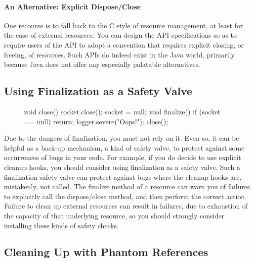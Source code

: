 \paragraph{An Alternative: Explicit Dispose/Close}
One recourse is to fall back to the C style of resource management, at least for
the case of external resources. You can design the API specifications so as to
require users of the API to adopt a convention that requires explicit closing,
or freeing, of resources. Such APIs do indeed exist in the Java world, primarily
because Java does not offer any especially palatable alternatives.

\subsection{Using Finalization as a Safety Valve}

\begin{figure}
\centering
\vspace{-4mm}
\begin{framedlisting}
void close() {
  socket.close();
  socket = null;
}
void finalize() {
  if (socket == null) return;
  logger.severe("Oops!");
  close();
}
\end{framedlisting}
\end{figure}

Due to the dangers of finalization, you must not rely on it. Even so, it can be
helpful as a back-up mechanism, a kind of safety valve, to protect against some
occurrences of bugs in your code. For example, if you do decide to use explicit
cleanup hooks, you should consider using finalization as a safety valve. Such a
finalization safety valve can protect against bugs where the cleanup hooks are,
mistakenly, not called. The finalize method of a resource can warn you of
failures to explicitly call the dispose/close method, and then perform the
correct action. Failure to clean up external resources can result in failures,
due to exhaustion of the capacity of that underlying resource, so you should
strongly consider installing these kinds of safety checks.

\subsection{Cleaning Up with Phantom References}
\label{sec:external-resources-details}

